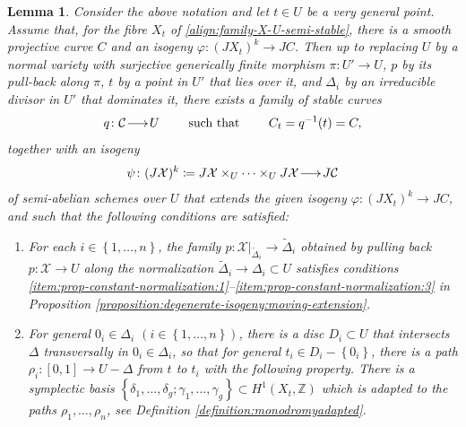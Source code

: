 \documentclass[a4paper,11pt,reqno]{amsart}
\makeatletter
\numberwithin{equation}{section}
\theoremstyle{plain}
\newtheorem{lemma}[theorem]{Lemma}
\theoremstyle{definition}
\newcommand{\Z}{\mathbb Z}
\newcommand{\ca}[1]{{\mathcal{#1}}}
\newcommand{\wt}[1]{{\widetilde{#1}}}
\renewcommand{\longrightarrow}{\xymatrix@1@=15pt{\ar[r]&}}
\newcommand{\set}[1]{\left\{ #1 \right\}}
\makeatother
\begin{document}
\begin{lemma} \label{lemma:extending-isogeny:existence:3rd}
 Consider the above notation and let $t\in U$ be a very general point.  
Assume that, for the  fibre $X_t$ of \eqref{align:family-X-U-semi-stable}, there is a smooth projective curve $C$ and an isogeny $\varphi \colon (JX_t)^k \to JC$.   
Then up to replacing $U$ by a normal variety with surjective generically finite morphism $\pi \colon U' \to U$, $p$ by its pull-back along $\pi$, $t$ by a point in $U'$ that lies over it, and $\Delta_i$ by an irreducible divisor in $U'$ that dominates it, there exists a family of stable curves $$q \colon \ca C \longrightarrow U \quad \quad \text{ such that } \quad \quad C_t = q^{-1}(t) = C,$$ together with an isogeny 
    \begin{align} \label{isogeny:semi-abelian:U:2nd} 
\psi \colon (J\mathcal X)^k \coloneqq 
J\mathcal X\times_{U}\dots \times_{U} J\mathcal X\longrightarrow J\mathcal C
\end{align}
of semi-abelian schemes over $U$ that extends the given isogeny $\varphi \colon (JX_t)^k \to JC$, and such that the following conditions are satisfied:
\begin{enumerate}[label=(\roman*)] 
    \item \label{item:condition(ii)}
     For each $i \in \set{1,\dotsc, n}$, the family $p \colon \ca X|_{\wt \Delta_i} \to \wt \Delta_i$ obtained by pulling back $p \colon \ca X \to U$ along the normalization $\wt \Delta_i \to \Delta_i \subset U$ satisfies conditions \ref{item:prop-constant-normalization:1}--\ref{item:prop-constant-normalization:3} in Proposition \ref{proposition:degenerate-isogeny:moving-extension}. 
    \item \label{item:condition(iii)} 
For general $0_i \in \Delta_i$ $(i \in \set{1, \dotsc, n})$, there is a disc $D_i \subset U$ that intersects $\Delta$ transversally in $0_i \in \Delta_i$, so that for general $t_i \in D_i - \set{0_i}$, there is a path $\rho_i \colon [0,1] \to U - \Delta$ from $t$ to $t_i$ with the following property.
There is a symplectic basis $\set{ \delta_1, \dotsc, \delta_g; \gamma_1, \dotsc, \gamma_g} \subset  H^1(X_t,\Z)$ which is adapted to the paths $\rho_1, \dotsc, \rho_n$, see Definition \ref{definition:monodromyadapted}. 
\end{enumerate}
\end{lemma}
\end{document}
